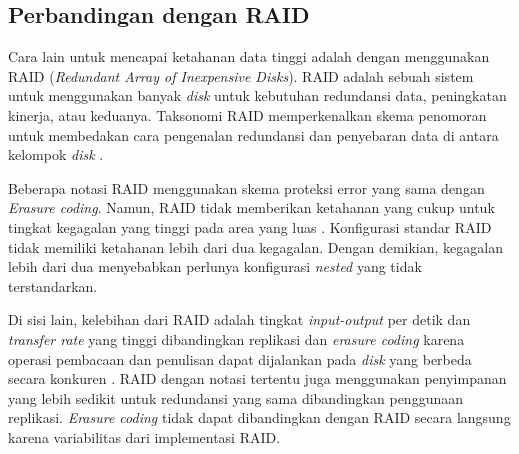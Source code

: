 \subsection{Perbandingan dengan RAID}
\label{sec:perbedaan-dengan-raid}

Cara lain untuk mencapai ketahanan data tinggi adalah dengan menggunakan RAID (\textit{Redundant Array of Inexpensive Disks}). RAID adalah sebuah sistem untuk menggunakan banyak \textit{disk} untuk kebutuhan redundansi data, peningkatan kinerja, atau keduanya. Taksonomi RAID memperkenalkan skema penomoran untuk membedakan cara pengenalan redundansi dan penyebaran data di antara kelompok \textit{disk} \parencite{katz2010raid}.


Beberapa notasi RAID menggunakan skema proteksi error yang sama dengan \textit{Erasure coding}. Namun, RAID tidak memberikan ketahanan yang cukup untuk tingkat kegagalan yang tinggi pada area yang luas \parencite{weatherspoon2002erasure}. Konfigurasi standar RAID tidak memiliki ketahanan lebih dari dua kegagalan. Dengan demikian, kegagalan lebih dari dua menyebabkan perlunya konfigurasi \textit{nested} yang tidak terstandarkan.

Di sisi lain, kelebihan dari RAID adalah tingkat \textit{input-output} per detik dan \textit{transfer rate} yang tinggi dibandingkan replikasi dan \textit{erasure coding} karena operasi pembacaan dan penulisan dapat dijalankan pada \textit{disk} yang berbeda secara konkuren \parencite{katz2010raid}. RAID dengan notasi tertentu juga menggunakan penyimpanan yang lebih sedikit untuk redundansi yang sama dibandingkan penggunaan replikasi. \textit{Erasure coding} tidak dapat dibandingkan dengan RAID secara langsung karena variabilitas dari implementasi RAID.
